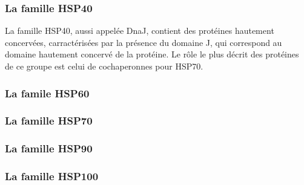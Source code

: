\subsubsection{La famille HSP40} %
\label{ssub:la_famille_hsp40}

  La famille HSP40, aussi appelée DnaJ, contient des protéines hautement
  concervées, carractérisées par la présence du domaine J, qui correspond au
  domaine hautement concervé de la protéine. Le rôle le plus décrit des
  protéines de ce groupe est celui de cochaperonnes pour HSP70.

\subsubsection{La famile HSP60} %
\label{ssub:la_famile_hsp60}

\subsubsection{La famille HSP70} %
\label{ssub:la_famille_hsp70}

\subsubsection{La famille HSP90} %
\label{ssub:la_famille_hsp90}

\subsubsection{La famille HSP100} %
\label{ssub:la_famille_hsp100}



